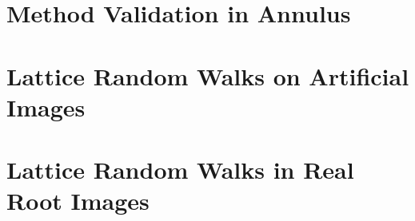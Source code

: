 \documentclass{uofsthesis-cs}
\begin{document}
  
\chapter{Method Validation in Annulus}

  

  

  

  


  
\chapter{Lattice Random Walks on Artificial Images}

  

  

  


\chapter{Lattice Random Walks in Real Root Images}
  

  

  
\end{document}
